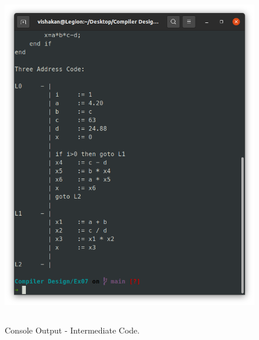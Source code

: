 \documentclass[12pt, a4]{article}
\begin{document}
\newpage
\subsection*{}
\begin{figure}[h]
\centering
\caption{Console Output - Intermediate Code.}
\includegraphics[height=15cm, width=15cm]{Output2.png}
\end{figure}

\newpage
\end{document}
